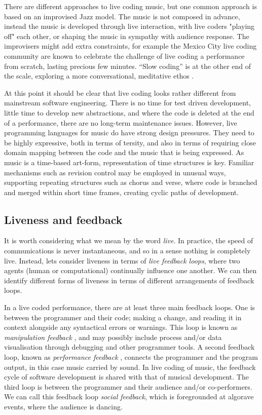 \documentclass[authoryear]{sigplanconf}
\begin{document}
There are different approaches to live coding music, but one common
approach is based on an improvised Jazz model. The music is not
composed in advance, instead the music is developed through live
interaction, with live coders "playing off" each other, or shaping the
music in sympathy with audience response. The improvisers might add
extra constraints, for example the Mexico City live coding community
are known to celebrate the challenge of live coding a performance from
scratch, lasting precious few minutes. ``Slow coding'' is at the other
end of the scale, exploring a more conversational, meditative ethos
\citep{Hall07}.

At this point it should be clear that live coding looks rather
different from mainstream software engineering. There is no time for
test driven development, little time to develop new abstractions, and
where the code is deleted at the end of a performance, there are no
long-term maintenance issues. However, live programming languages for
music do have strong design pressures. They need to be highly
expressive, both in terms of tersity, and also in terms of requiring
close domain mapping between the code and the music that is being
expressed. As music is a time-based art-form, representation of time
structures is key. Familiar mechanisms such as revision control may be
employed in unusual ways, supporting repeating structures such as
chorus and verse, where code is branched and merged within short
time frames, creating cyclic paths of development.

\subsection{Liveness and feedback}

It is worth considering what we mean by the word \emph{live}. In
practice, the speed of communications is never instantaneous, and so
in a sense nothing is completely live. Instead, lets consider liveness
in terms of \emph{live feedback loops}, where two agents (human or
computational) continually influence one another. We can then identify
different forms of liveness in terms of different arrangements of
feedback loops.

In a live coded performance, there are at least three main feedback
loops. One is between the programmer and their code; making a change,
and reading it in context alongside any syntactical errors or
warnings. This loop is known as \emph{manipulation feedback}
\citep{Nash11}, and may possibly include process and/or data
visualisation through debugging and other programmer tools. A second
feedback loop, known as \emph{performance feedback} \citep{Nash11},
connects the programmer and the program output, in this case music
carried by sound. In live coding of music, the feedback cycle of
software development is shared with that of musical development. The
third loop is between the programmer and their audience and/or
co-performers. We can call this feedback loop \emph{social feedback},
which is foregrounded at algorave events, where the audience is
dancing.
\end{document}
